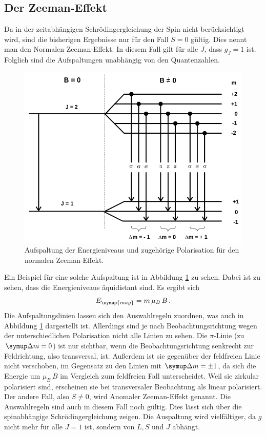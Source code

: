 \documentclass[
  bibliography=totoc,     %
  captions=tableheading,  %
  titlepage=firstiscover, %
]{scrartcl}
\begin{document}
\subsection{Der Zeeman-Effekt}
%
Da in der zeitabhängigen Schrödingergleichung der Spin nicht berücksichtigt wird,
sind die bisherigen Ergebnisse nur für den Fall $S = 0$ gültig. Dies nennt man
den Normalen Zeeman-Effekt. In diesem Fall gilt für
alle $J$, dass $g_J = 1$ ist. Folglich sind die Aufspaltungen unabhängig von den
Quantenzahlen.
\begin{figure}
  \centering
  \includegraphics[scale=0.4]{normal.png}
  \caption{Aufspaltung der Energieniveaus und zugehörige Polarisation für den
  normalen Zeeman-Effekt. \cite{anleitung}}
  \label{fig:1}
\end{figure}
Ein Beispiel für eine solche Aufspaltung ist in Abbildung \ref{fig:1} zu sehen.
Dabei ist zu sehen, dass die Energieniveaus äquidistant sind. Es ergibt sich
\begin{equation}
  E_{\symup{mag}}= m \, \mu_B \, B \, .
  \label{eqn:10}
\end{equation}
Die Aufspaltungslinien lassen sich den Auswahlregeln zuordnen, was auch in
Abbildung \ref{fig:1} dargestellt ist. Allerdings sind je nach Beobachtungsrichtung
wegen der unterschiedlichen Polarisation nicht alle Linien zu sehen. Die $\pi$-Linie
(zu $\symup \Delta m = 0$) ist nur sichtbar, wenn die Beobachtungsrichtung
senkrecht zur Feldrichtung, also transversal, ist. Außerdem ist sie gegenüber
der feldfreien Linie nicht verschoben, im Gegensatz zu den Linien mit $\symup \Delta m = \pm 1$,
da sich die Energie um $\mu_B \, B$ im Vergleich zum feldfreien Fall unterscheidet.
Weil sie zirkular polarisiert sind, erscheinen sie bei transversaler Beobachtung als
linear polarisiert.
Der andere Fall, also $S \neq 0$, wird Anomaler Zeeman-Effekt genannt.
Die Auswahlregeln sind auch in diesem Fall noch gültig. Dies lässt
sich über die spinabhängige Schrödingergleichung zeigen. Die Auspaltung wird
vielfältiger, da $g$ nicht mehr für alle $J=1$ ist, sondern von $L, S$ und $J$
abhängt.
\end{document}
